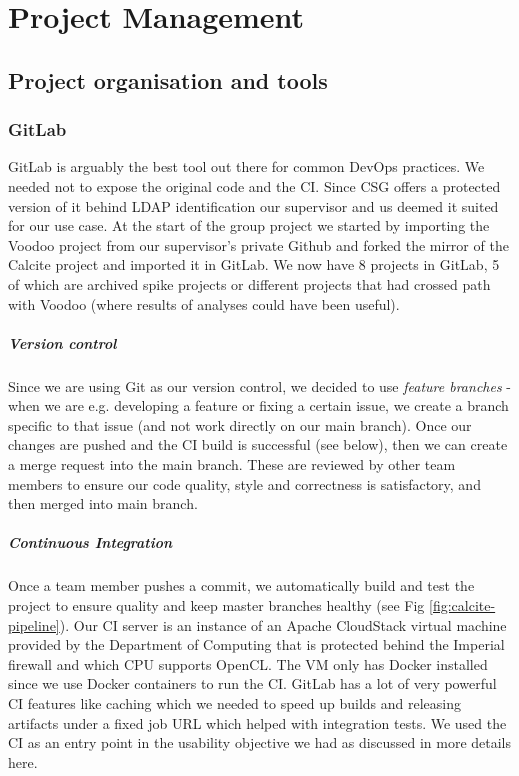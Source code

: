 \chapter{Project Management}

\section{Project organisation and tools}

\subsection{GitLab}

GitLab is arguably the best tool out there for common DevOps practices. We needed not to expose the original code and the CI. Since CSG offers a protected version of it behind LDAP identification our supervisor and us deemed it suited for our use case. At the start of the group project we started by importing the Voodoo project from our supervisor's private Github and forked the mirror of the Calcite project and imported it in GitLab. We now have 8 projects in GitLab, 5 of which are archived spike projects or different projects that had crossed path with Voodoo (where results of analyses could have been useful).

\paragraph{Version control}
Since we are using Git as our version control, we decided to use \textit{feature branches} - when we are e.g. developing a feature or fixing a certain issue, we create a branch specific to that issue (and not work directly on our main branch). Once our changes are pushed and the CI build is successful (see below), then we can create a merge request into the main branch. These are reviewed by other team members to ensure our code quality, style and correctness is satisfactory, and then merged into main branch.

\paragraph{Continuous Integration}
Once a team member pushes a commit, we automatically build and test the project to ensure quality and keep master branches healthy (see Fig \ref{fig:calcite-pipeline}). Our CI server is an instance of an Apache CloudStack virtual machine provided by the Department of Computing that is protected behind the Imperial firewall and which CPU supports OpenCL. The VM only has Docker installed since we use Docker containers to run the CI. GitLab has a lot of very powerful CI features like caching which we needed to speed up builds and releasing artifacts under a fixed job URL which helped with integration tests. We used the CI as an entry point in the usability objective we had as discussed in more details here.

